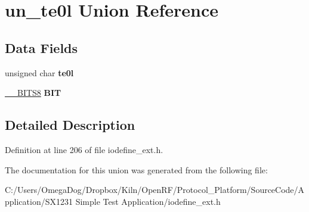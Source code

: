 \hypertarget{unionun__te0l}{\section{un\-\_\-te0l Union Reference}
\label{unionun__te0l}
}
\subsection*{Data Fields}
\begin{DoxyCompactItemize}
\item 
\hypertarget{unionun__te0l_a08e95792c4208e9f071ba04a3381ae7d}{unsigned char {\bfseries te0l}}\label{unionun__te0l_a08e95792c4208e9f071ba04a3381ae7d}

\item 
\hypertarget{unionun__te0l_a3a6f69b7f6f541aa57731571be474bcb}{\hyperlink{struct_____b_i_t_s8}{\-\_\-\-\_\-\-B\-I\-T\-S8} {\bfseries B\-I\-T}}\label{unionun__te0l_a3a6f69b7f6f541aa57731571be474bcb}

\end{DoxyCompactItemize}


\subsection{Detailed Description}


Definition at line 206 of file iodefine\-\_\-ext.\-h.



The documentation for this union was generated from the following file\-:\begin{DoxyCompactItemize}
\item 
C\-:/\-Users/\-Omega\-Dog/\-Dropbox/\-Kiln/\-Open\-R\-F/\-Protocol\-\_\-\-Platform/\-Source\-Code/\-Application/\-S\-X1231 Simple Test Application/iodefine\-\_\-ext.\-h\end{DoxyCompactItemize}

